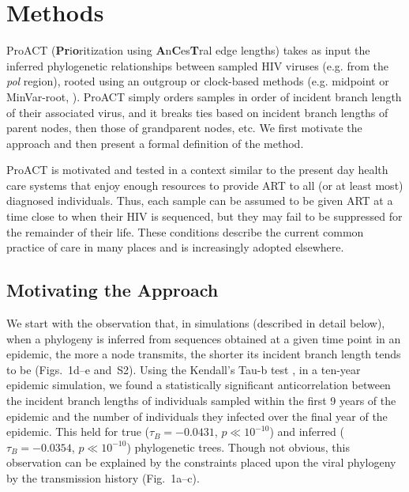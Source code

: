 \documentclass[oupdraft]{sysbio}
\newcommand{\PLWH}{sample\xspace}
\begin{document}
\section{Methods}
ProACT (\textbf{Pr}i\textbf{o}ritization using \textbf{A}n\textbf{C}es\textbf{T}ral edge lengths) takes as input the inferred phylogenetic relationships between sampled HIV viruses (e.g. from the \textit{pol} region), rooted using an outgroup or clock-based methods (e.g. midpoint or MinVar-root, \citet{Mai2017}). 
ProACT simply orders \PLWH{s} in order of incident branch length of their associated virus, and it breaks ties based on incident branch lengths of parent nodes, then those of grandparent nodes, etc.
We first motivate the approach and then present a formal definition of the method.

ProACT is motivated and tested in a context similar to the present day health care systems that enjoy enough resources to provide ART to all (or at least most) diagnosed individuals.
Thus, each \PLWH can be assumed to be given ART at a time close to when their HIV is sequenced, but they may fail to be suppressed for the remainder of their life.
These conditions describe the current common practice of care in many places and is increasingly adopted elsewhere. %


\subsection{Motivating the Approach}

We start with the observation that, in simulations (described in detail below),
when a phylogeny is inferred from sequences obtained at a given time point in an epidemic,
the more a node transmits, the shorter its incident branch length tends to be
(Figs.~1d--e and~S2).
Using the Kendall's Tau-b test \cite{Kendall1938}, in a ten-year epidemic simulation, we found a statistically significant anticorrelation between the incident branch lengths of individuals sampled within the first 9 years of the epidemic and the number of individuals they infected over the final year of the epidemic. This held for true ($\tau_B=-0.0431$, $p\ll 10^{-10}$) and inferred ($\tau_B=-0.0354$, $p\ll 10^{-10}$) phylogenetic trees.
Though not obvious, this observation can be explained by the constraints placed upon the viral phylogeny by the transmission history (Fig.~1a--c).
\end{document}
